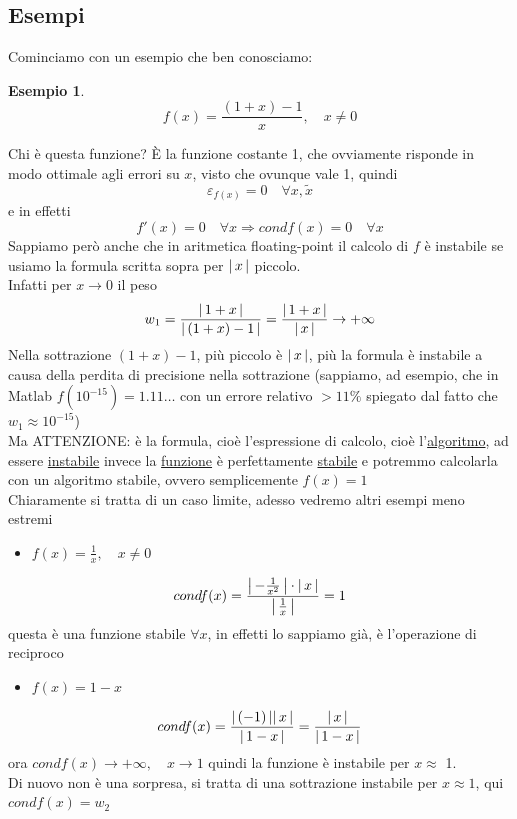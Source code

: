 \documentclass[12pt]{article}
\newtheorem*{esempio}{Esempio}
\DeclarePairedDelimiter{\abs}{\lvert}{\rvert}
\begin{document}
\subsection{Esempi}
Cominciamo con un esempio che ben conosciamo: \newline
\begin{esempio}
\[ f(x)=\frac{(1+x)-1}{x}, \quad x \neq 0 \] \end{esempio}
Chi è questa funzione? È la funzione costante 1, che ovviamente risponde in modo ottimale agli errori su $x$, visto che ovunque vale 1, quindi \[\varepsilon_{f(x)}=0 \quad \forall x,\tilde{x}\] 
e in effetti \[f'(x)=0 \quad \forall x \Rightarrow cond f(x)=0 \quad \forall x\]
Sappiamo però anche che in aritmetica floating-point il calcolo di $f$ è instabile se usiamo la formula scritta sopra per $\abs{\,x\,}$ piccolo.\\
Infatti per $x\rightarrow 0$ il peso
\[ w_1=\frac{\abs{\,1+x\,}}{\abs{\,(1+x)-1\,}}=\frac{\abs{\,1+x\,}}{\abs{\,x\,}}\rightarrow +\infty \] \newline \newline
Nella sottrazione $(1+x)-1$, più piccolo è $\abs{\,x\,}$, più la formula è instabile a causa della perdita di precisione nella sottrazione
(sappiamo, ad esempio, che in Matlab $f(10^{-15})=1.11 \dotsc$ con un errore relativo $>11\%$ spiegato dal fatto che $w_1\approx 10^{-15}$)\\
Ma ATTENZIONE: è la formula, cioè l'espressione di calcolo, cioè l'\uline{algoritmo}, ad essere \uline{instabile} invece la \uline{funzione} è perfettamente \uline{stabile} e potremmo calcolarla con un algoritmo stabile, ovvero semplicemente $f(x)=1$\\
Chiaramente si tratta di un caso limite, adesso vedremo altri esempi meno estremi
\begin{itemize} %
    \item $f(x)=\frac{1}{x},\quad x\neq 0$
\end{itemize}
\[cond f(x)= \frac{\abs*{\,-\frac{1}{x^2}\,} \cdot \abs{\,x\,}}{\abs*{\,\frac{1}{x}\,}} = 1 \]
questa è una funzione stabile $\forall x$, in effetti lo sappiamo già, è l'operazione di reciproco \newline

\begin{itemize} %
    \item $f(x)=1-x$
\end{itemize}
\[ cond f(x)= \frac{\abs{\,(-1)\,}\abs{\,x\,}}{\abs{\,1-x\,}} = \frac{\abs{\,x\,}}{\abs{\,1-x\,}} \] 
ora $cond f(x)\rightarrow +\infty, \quad x\rightarrow 1$ quindi la funzione è instabile per $x\approx$ 1.\\
Di nuovo non è una sorpresa, si tratta di una sottrazione instabile per $x\approx1$, qui $condf(x)=w_2$ \newline
\end{document}
